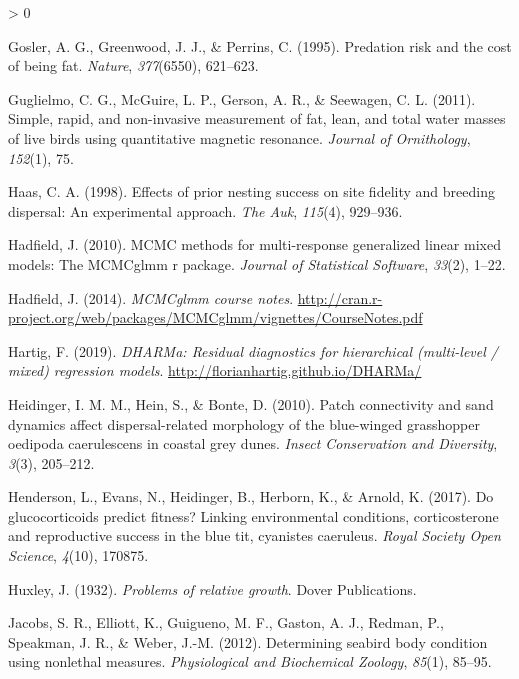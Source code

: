 \documentclass[
]{article}
\newlength{\cslhangindent}
\newenvironment{CSLReferences}[2] %
 {%
  \setlength{\parindent}{0pt}
  \ifodd #1 \everypar{\setlength{\hangindent}{\cslhangindent}}\ignorespaces\fi
  \ifnum #2 > 0
  \setlength{\parskip}{#2\baselineskip}
  \fi
 }%
 {}
\begin{document}
\begin{CSLReferences}{1}{0}
\leavevmode\hypertarget{ref-gosler1995predation}{}%
Gosler, A. G., Greenwood, J. J., \& Perrins, C. (1995). Predation risk
and the cost of being fat. \emph{Nature}, \emph{377}(6550), 621--623.

\leavevmode\hypertarget{ref-guglielmo2011simple}{}%
Guglielmo, C. G., McGuire, L. P., Gerson, A. R., \& Seewagen, C. L.
(2011). Simple, rapid, and non-invasive measurement of fat, lean, and
total water masses of live birds using quantitative magnetic resonance.
\emph{Journal of Ornithology}, \emph{152}(1), 75.

\leavevmode\hypertarget{ref-haas1998effects}{}%
Haas, C. A. (1998). Effects of prior nesting success on site fidelity
and breeding dispersal: An experimental approach. \emph{The Auk},
\emph{115}(4), 929--936.

\leavevmode\hypertarget{ref-hadfield2010mcmc}{}%
Hadfield, J. (2010). MCMC methods for multi-response generalized linear
mixed models: The MCMCglmm r package. \emph{Journal of Statistical
Software}, \emph{33}(2), 1--22.

\leavevmode\hypertarget{ref-hadfield2014coursenotes}{}%
Hadfield, J. (2014). \emph{MCMCglmm course notes}.
\url{http://cran.r-project.org/web/packages/MCMCglmm/vignettes/CourseNotes.pdf}

\leavevmode\hypertarget{ref-Hartig2019dharma}{}%
Hartig, F. (2019). \emph{DHARMa: Residual diagnostics for hierarchical
(multi-level / mixed) regression models}.
\url{http://florianhartig.github.io/DHARMa/}

\leavevmode\hypertarget{ref-heidinger2010patch}{}%
Heidinger, I. M. M., Hein, S., \& Bonte, D. (2010). Patch connectivity
and sand dynamics affect dispersal-related morphology of the blue-winged
grasshopper oedipoda caerulescens in coastal grey dunes. \emph{Insect
Conservation and Diversity}, \emph{3}(3), 205--212.

\leavevmode\hypertarget{ref-henderson2017glucocorticoids}{}%
Henderson, L., Evans, N., Heidinger, B., Herborn, K., \& Arnold, K.
(2017). Do glucocorticoids predict fitness? Linking environmental
conditions, corticosterone and reproductive success in the blue tit,
cyanistes caeruleus. \emph{Royal Society Open Science}, \emph{4}(10),
170875.

\leavevmode\hypertarget{ref-huxley1932problems}{}%
Huxley, J. (1932). \emph{Problems of relative growth}. Dover
Publications.

\leavevmode\hypertarget{ref-jacobs2012determining}{}%
Jacobs, S. R., Elliott, K., Guigueno, M. F., Gaston, A. J., Redman, P.,
Speakman, J. R., \& Weber, J.-M. (2012). Determining seabird body
condition using nonlethal measures. \emph{Physiological and Biochemical
Zoology}, \emph{85}(1), 85--95.


\end{CSLReferences}
\end{document}
